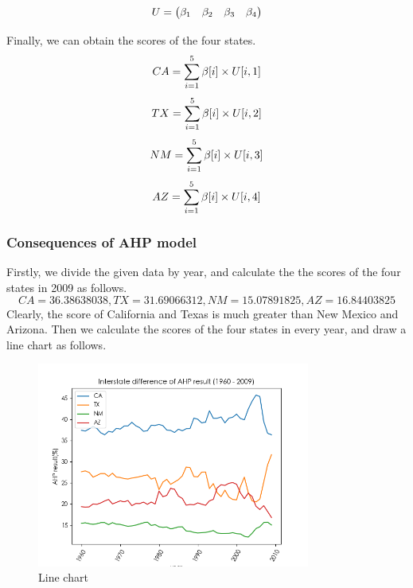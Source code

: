 \documentclass[a4paper,11pt]{article}
\begin{document}
\begin{equation}
    \centering
U=\begin{pmatrix} \beta_1 & \beta_2 & \beta_3 & \beta_4\end{pmatrix}
\end{equation}
\par Finally, we can obtain the scores of the four states.
\begin{equation}
    \centering
    CA=\sum_{i=1}^{5}\beta[i] \times U[i,1]
\end{equation}
\begin{equation}
    \centering
    TX=\sum_{i=1}^{5}\beta[i] \times U[i,2]
\end{equation}
\begin{equation}
    \centering
    NM=\sum_{i=1}^{5}\beta[i] \times U[i,3]
\end{equation}
\begin{equation}
    \centering
    AZ=\sum_{i=1}^{5}\beta[i] \times U[i,4]
\end{equation}

\subsubsection{Consequences of AHP model}
\par Firstly, we divide the given data by year, and calculate the the scores of the four states in 2009 as follows.
\[
    CA=36.38638038, TX=31.69066312, NM=15.07891825, AZ=16.84403825
\]
Clearly, the score of California and Texas is much greater than New Mexico and Arizona.
Then we calculate the scores of the four states in every year, and draw a line chart as follows.
\begin{figure}[!hptb] 
    \centering 
    \includegraphics[width=0.8\textwidth]{1-2.png}
    \caption{Line chart}
\end{figure}
\end{document}
